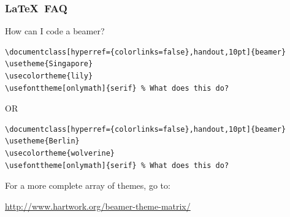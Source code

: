 \documentclass[hyperref={colorlinks=false},handout,10pt]{beamer}
\def\LaTeXs{\LaTeX\ }
\begin{document}
%


%    
%    

\begin{frame}[fragile]
    \frametitle{\LaTeXs FAQ}
    \begin{block}{How can I code a beamer?} 
\begin{lstlisting}
\documentclass[hyperref={colorlinks=false},handout,10pt]{beamer}
\usetheme{Singapore}
\usecolortheme{lily}
\usefonttheme[onlymath]{serif} % What does this do? 
\end{lstlisting}    
    OR
\begin{lstlisting}
\documentclass[hyperref={colorlinks=false},handout,10pt]{beamer}
\usetheme{Berlin}
\usecolortheme{wolverine}
\usefonttheme[onlymath]{serif} % What does this do? 
\end{lstlisting}    
\end{block}
    For a more complete array of themes, go to: 
    \begin{center}
        \href{http://www.hartwork.org/beamer-theme-matrix/}{{http://www.hartwork.org/beamer-theme-matrix/}}
    \end{center}
\end{frame}
\end{document}
